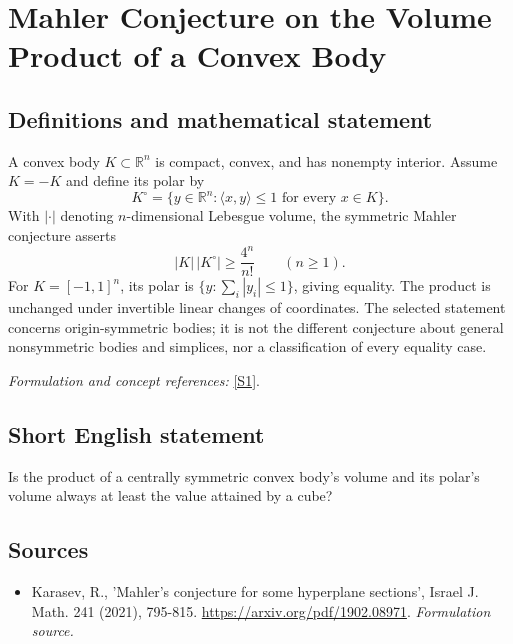 \documentclass[11pt]{article}
\begin{document}
\section*{\texorpdfstring{Mahler Conjecture on the Volume Product of a Convex Body}{Mahler Conjecture on the Volume Product of a Convex Body}}\label{302}
\subsection{Definitions and mathematical statement}
A convex body $K\subset{\mathbb{R}}^n$ is compact, convex, and has nonempty interior. Assume $K=-K$ and define its polar by
\[
 K^\circ=\{y\in{\mathbb{R}}^n:\langle x,y\rangle\le1\text{ for every }x\in K\}.
\]
With $|\cdot|$ denoting $n$-dimensional Lebesgue volume, the symmetric Mahler conjecture asserts
\[
 |K|\,|K^\circ|\ge\frac{4^n}{n!}\qquad(n\ge1).
\]
For $K=[-1,1]^n$, its polar is $\{y:\sum_i|y_i|\le1\}$, giving equality. The product is unchanged under invertible linear changes of coordinates. The selected statement concerns origin-symmetric bodies; it is not the different conjecture about general nonsymmetric bodies and simplices, nor a classification of every equality case.
\par\smallskip\textit{Formulation and concept references:} \href{https://arxiv.org/pdf/1902.08971}{[S1]}.

\subsection{Short English statement}
Is the product of a centrally symmetric convex body's volume and its polar's volume always at least the value attained by a cube?
\subsection{Sources}
\begin{itemize}
\item[S1]Karasev, R., 'Mahler's conjecture for some hyperplane sections', Israel J. Math. 241 (2021), 795-815.
\url{https://arxiv.org/pdf/1902.08971}.
\textit{Formulation source.}
\end{itemize}
\end{document}
